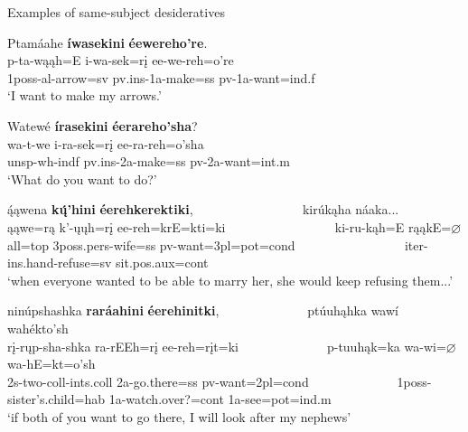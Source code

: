 \begin{exe}
    \item\label{Ch5Desideratives} Examples of same-subject desideratives

    \begin{xlist}
        \item\label{Ch5DesiderativesA} \glll Ptamáahe \textbf{íwasekini} \textbf{éewereho're}.\\
        p-ta-wąąh=E i-wa-sek=rį ee-we-reh=o're\\
        1poss-al-\textnormal{arrow}=sv pv.ins-1a-\textnormal{make}=ss pv-1a-\textnormal{want}=ind.f\\
        \glt `I want to make my arrows.' \citep[284]{hollow1973b}

        \item\label{Ch5DesiderativesB} \glll Watewé \textbf{írasekini} \textbf{éerareho'sha}?\\
        wa-t-we i-ra-sek=rį ee-ra-reh=o'sha\\
        unsp-wh-indf pv.ins-2a-\textnormal{make}=ss pv-2a-\textnormal{want}=int.m\\
        \glt `What do you want to do?' \citep[305]{hollow1973b}

        \item\label{Ch5DesiderativesC} \glll ą́ąwena \textbf{kų́'hini} \textbf{éerehkerektiki}, ~ ~ ~ ~ ~ ~ ~ ~ ~ ~ kirúkąha náaka...\\
        ąąwe=rą k'-ųųh=rį ee-reh=krE=kti=ki ~ ~ ~ ~ ~ ~ ~ ~ ~ ~ ki-ru-kąh=E rąąkE=$\varnothing$\\
        \textnormal{all}=top 3poss.pers-\textnormal{wife}=ss pv-\textnormal{want}=3pl=pot=cond ~ ~ ~ ~ ~ ~ ~ ~ ~ ~ iter-ins.hand-\textnormal{refuse}=sv \textnormal{sit}.pos.aux=cont\\
        \glt `when everyone wanted to be able to marry her, she would keep refusing them...' \citep[125]{hollow1973a}

        \item\label{Ch5DesiderativesD} \glll ninúpshashka \textbf{raráahini} \textbf{éerehinitki}, ~ ~ ~ ~ ~ ~ ~ ~ ptúuhąhka wawí wahékto'sh\\
        rį-rųp-sha-shka ra-rEEh=rį ee-reh=rįt=ki ~ ~ ~ ~ ~ ~ ~ ~ p-tuuhąk=ka wa-wi=$\varnothing$ wa-hE=kt=o'sh\\
        2s-\textnormal{two}-coll-ints.coll 2a-\textnormal{go.there}=ss pv-\textnormal{want}=2pl=cond ~ ~ ~ ~ ~ ~ ~ ~ 1poss-\textnormal{sister's.child}=hab 1a-\textnormal{watch.over?}=cont 1a-\textnormal{see}=pot=ind.m\\
        \glt `if both of you want to go there, I will look after my nephews' \citep[64]{hollow1973b}  


\end{xlist}
\end{exe}
